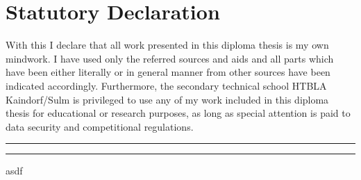 \chapter*{Statutory Declaration}
With this I declare that all work presented in this diploma thesis is my own mindwork. I have used only the referred sources and aids and all parts which have been either literally or in general manner from other sources have been indicated accordingly.
\newline \newline
Furthermore, the secondary technical school HTBLA Kaindorf/Sulm is privileged to use any of my work included in this diploma thesis for educational or research purposes, as long as special attention is paid to data security and competitional regulations.
\par\bigskip

\par\bigskip

\par\bigskip

\par\bigskip

\par\bigskip

\par\bigskip

\par\bigskip

\par\bigskip

\par\bigskip

\par\bigskip

\par\bigskip

\par\bigskip

\rule{6cm}{0.4pt} \space \rule{6cm}{0.4pt} 

asdf
